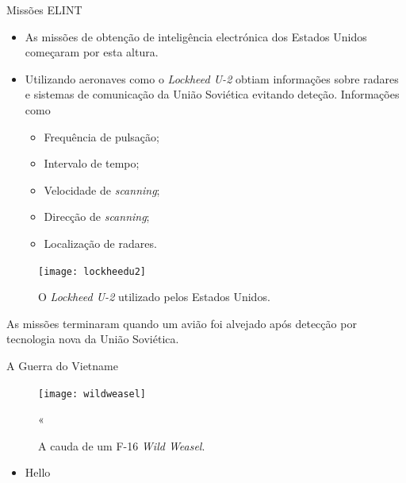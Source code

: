 \documentclass[portuguese,10pt]{beamer}
\begin{document}
\begin{frame}{Missões ELINT}
    \begin{minipage}[c]{0.57\textwidth}
        \begin{itemize}
            \item As missões de obtenção de inteligência electrónica dos Estados Unidos começaram por esta altura.
            \item Utilizando aeronaves como o \textit{Lockheed U-2} obtiam informações sobre radares e sistemas de comunicação da União Soviética evitando deteção. Informações como
            \begin{itemize}
                \item Frequência de pulsação;
                \item Intervalo de tempo;
                \item Velocidade de \textit{scanning};
                \item Direcção de \textit{scanning};
                \item Localização de radares.
            \end{itemize}
        \end{itemize}
    \end{minipage}
    \hfill
    \begin{minipage}[c]{0.4\textwidth}
        \begin{figure}
            \centering
            \texttt{[image: lockheedu2]}
            \caption{O \textit{Lockheed U-2} utilizado pelos Estados Unidos.}
        \end{figure}
    \end{minipage}
    \vspace*{5mm}
    
    As missões terminaram quando um avião foi alvejado após detecção por tecnologia nova da União Soviética.
\end{frame}

\begin{frame}{A Guerra do Vietname}
    \begin{minipage}[c]{0.44\textwidth}
        \begin{figure}
            \centering
            \texttt{[image: wildweasel]}
            \caption{A cauda de um F-16 \textit{Wild Weasel}.}«
        \end{figure}
    \end{minipage}
    \hfill
    \begin{minipage}[c]{0.55\textwidth}
        \begin{itemize}
            \item Hello
        \end{itemize}
    \end{minipage}
\end{frame}
\end{document}
